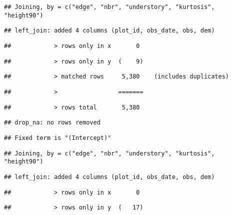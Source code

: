 \documentclass[
]{article}
\begin{document}
\begin{verbatim}
## Joining, by = c("edge", "nbr", "understory", "kurtosis", "height90")
\end{verbatim}

\begin{verbatim}
## left_join: added 4 columns (plot_id, obs_date, obs, dem)
\end{verbatim}

\begin{verbatim}
##            > rows only in x       0
\end{verbatim}

\begin{verbatim}
##            > rows only in y  (    9)
\end{verbatim}

\begin{verbatim}
##            > matched rows     5,380    (includes duplicates)
\end{verbatim}

\begin{verbatim}
##            >                 =======
\end{verbatim}

\begin{verbatim}
##            > rows total       5,380
\end{verbatim}

\begin{verbatim}
## drop_na: no rows removed
\end{verbatim}

\begin{verbatim}
## Fixed term is "(Intercept)"
\end{verbatim}

\begin{verbatim}
## Joining, by = c("edge", "nbr", "understory", "kurtosis", "height90")
\end{verbatim}

\begin{verbatim}
## left_join: added 4 columns (plot_id, obs_date, obs, dem)
\end{verbatim}

\begin{verbatim}
##            > rows only in x       0
\end{verbatim}

\begin{verbatim}
##            > rows only in y  (   17)
\end{verbatim}
\end{document}
